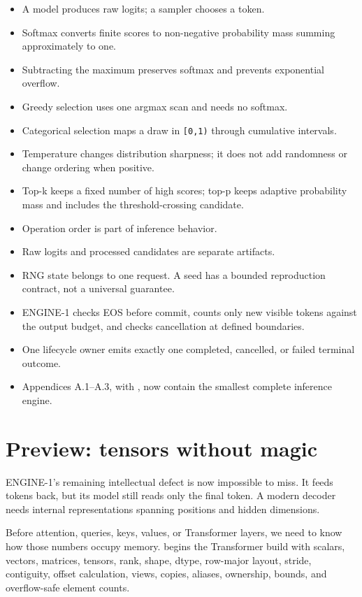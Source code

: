 \begin{itemize}
\tightlist
\item
  A model produces raw logits; a sampler chooses a token.
\item
  Softmax converts finite scores to non-negative probability mass
  summing approximately to one.
\item
  Subtracting the maximum preserves softmax and prevents exponential
  overflow.
\item
  Greedy selection uses one argmax scan and needs no softmax.
\item
  Categorical selection maps a draw in \texttt{{[}0,1)} through
  cumulative intervals.
\item
  Temperature changes distribution sharpness; it does not add randomness
  or change ordering when positive.
\item
  Top-k keeps a fixed number of high scores; top-p keeps adaptive
  probability mass and includes the threshold-crossing candidate.
\item
  Operation order is part of inference behavior.
\item
  Raw logits and processed candidates are separate artifacts.
\item
  RNG state belongs to one request. A seed has a bounded reproduction
  contract, not a universal guarantee.
\item
  ENGINE-1 checks EOS before commit, counts only new visible tokens
  against the output budget, and checks cancellation at defined
  boundaries.
\item
  One lifecycle owner emits exactly one completed, cancelled, or failed
  terminal outcome.
\item
  Appendices A.1--A.3, with , now contain the smallest
  complete inference engine.
\end{itemize}

\section{Preview: tensors without
magic}\label{part-ii-preview-tensors-without-magic}

ENGINE-1's remaining intellectual defect is now impossible to miss. It
feeds tokens back, but its model still reads only the final token. A
modern decoder needs internal representations spanning positions and
hidden dimensions.

Before attention, queries, keys, values, or Transformer layers, we need
to know how those numbers occupy memory.  begins the Transformer build with
scalars, vectors, matrices, tensors, rank, shape, dtype, row-major
layout, stride, contiguity, offset calculation, views, copies, aliases,
ownership, bounds, and overflow-safe element counts.

